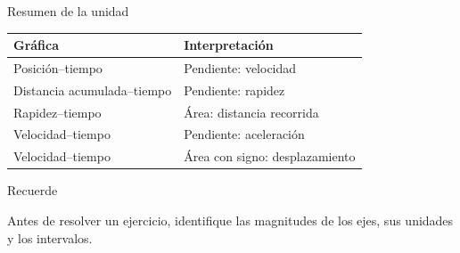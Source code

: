 \documentclass[aspectratio=169,10pt]{beamer}
\begin{document}
\begin{frame}{Resumen de la unidad}

\begin{center}
\renewcommand{\arraystretch}{1.6}

\begin{tabular}{|p{3.3cm}|p{6.3cm}|}
\hline
\textbf{Gráfica}
&
\textbf{Interpretación}\\
\hline

Posición--tiempo
&
Pendiente: velocidad\\
\hline

Distancia acumulada--tiempo
&
Pendiente: rapidez\\
\hline

Rapidez--tiempo
&
Área: distancia recorrida\\
\hline

Velocidad--tiempo
&
Pendiente: aceleración\\
\hline

Velocidad--tiempo
&
Área con signo: desplazamiento\\
\hline

\end{tabular}
\end{center}

\vspace{0.4cm}

\begin{exampleblock}{Recuerde}

Antes de resolver un ejercicio,
identifique las magnitudes de los ejes,
sus unidades y los intervalos.

\end{exampleblock}

\end{frame}
\end{document}
